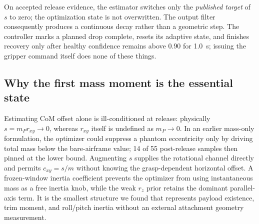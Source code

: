 \documentclass[conference]{IEEEtran}
\begin{document}
On accepted release evidence, the estimator switches only the
\emph{published target} of $s$ to zero; the optimization state is not overwritten. The output
filter consequently produces a continuous decay rather than a geometric step. The controller
marks a planned drop complete, resets its adaptive state, and finishes recovery only after healthy
confidence remains above 0.90 for \SI{1.0}{s}; issuing the gripper command itself does none of
these things.

\subsection{Why the first mass moment is the essential state}
Estimating CoM offset alone is ill-conditioned at release: physically
$s=m_P r_{xy}\rightarrow0$, whereas $r_{xy}$ itself is undefined as $m_P\rightarrow0$. In an
earlier mass-only formulation, the optimizer could suppress a phantom eccentricity only by
driving total mass below the bare-airframe value; 14 of 55 post-release samples then pinned at
the lower bound. Augmenting $s$ supplies the rotational channel directly and permits
$c_{xy}=s/m$ without knowing the grasp-dependent horizontal offset. A frozen-window inertia
coefficient prevents the optimizer from using instantaneous mass as a free inertia knob, while
the weak $r_z$ prior retains the dominant parallel-axis term. It is the smallest structure we
found that represents payload existence, trim moment, and roll/pitch inertia without an
external attachment geometry measurement.
\end{document}
